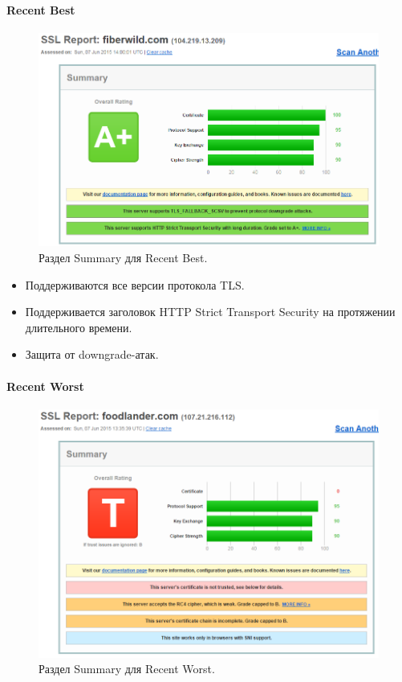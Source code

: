 \documentclass[a4paper, 14pt]{article}				%
\begin{document}
\paragraph {Recent Best\\}
\begin{figure}[h!]
\centering
\includegraphics[width=\textwidth]{rsrc/lab7_best}
\caption{Раздел Summary для Recent Best.}
\end{figure}
\begin{itemize}
\item{Поддерживаются все версии протокола TLS.}
\item{Поддерживается заголовок HTTP Strict Transport Security на протяжении длительного времени.}
\item{Защита от downgrade-атак.}
\end{itemize}

\newpage
\paragraph {Recent Worst\\}
\begin{figure}[h!]
\centering
\includegraphics[width=\textwidth]{rsrc/lab7_worst}
\caption{Раздел Summary для Recent Worst.}
\end{figure}
\end{document}

